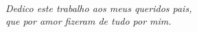 \

\vfill

\begin{flushright}
\hfill \textit{Dedico este trabalho aos meus queridos pais,\\ que por amor fizeram de tudo por mim. }
\end{flushright}

\vspace*{1cm}

\clearpage